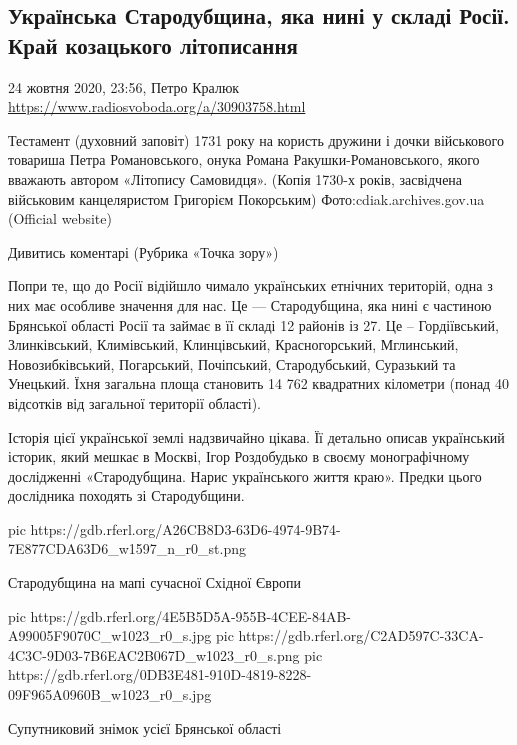  
 

\subsection{Українська Стародубщина, яка нині у складі Росії. Край козацького літописання}
\label{sec:24_10_2020.news.ua.radio_svoboda.1.starodub}
24 жовтня 2020, 23:56, Петро Кралюк
\url{https://www.radiosvoboda.org/a/30903758.html}

Тестамент (духовний заповіт) 1731 року на користь дружини і дочки військового
товариша Петра Романовського, онука Романа Ракушки-Романовського, якого
вважають автором «Літопису Самовидця». (Копія 1730-х років, засвідчена
військовим канцеляристом Григорієм Покорським) Фото:cdiak.archives.gov.ua
(Official website)

Дивитись коментарі (Рубрика «Точка зору»)

Попри те, що до Росії відійшло чимало українських етнічних територій, одна з
них має особливе значення для нас. Це --- Стародубщина, яка нині є частиною
Брянської області Росії та займає в її складі 12 районів із 27. Це –
Гордіївський, Злинківський, Климівський, Клинцівський, Красногорський,
Мглинський, Новозибківський, Погарський, Почіпський, Стародубський, Суразький
та Унецький. Їхня загальна площа становить 14 762 квадратних кілометри (понад
40 відсотків від загальної території області).

Історія цієї української землі надзвичайно цікава. Її детально описав
український історик, який мешкає в Москві, Ігор Роздобудько в своєму
монографічному дослідженні «Стародубщина. Нарис українського життя краю».
Предки цього дослідника походять зі Стародубщини.

\ifcmt
pic https://gdb.rferl.org/A26CB8D3-63D6-4974-9B74-7E877CDA63D6_w1597_n_r0_st.png
\fi

Стародубщина на мапі сучасної Східної Європи

\ifcmt
pic https://gdb.rferl.org/4E5B5D5A-955B-4CEE-84AB-A99005F9070C_w1023_r0_s.jpg
pic https://gdb.rferl.org/C2AD597C-33CA-4C3C-9D03-7B6EAC2B067D_w1023_r0_s.png
pic https://gdb.rferl.org/0DB3E481-910D-4819-8228-09F965A0960B_w1023_r0_s.jpg
\fi

Супутниковий знімок усієї Брянської області

